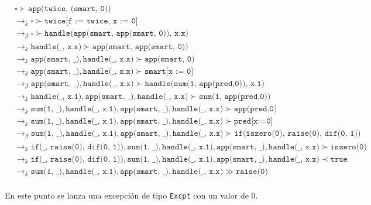 \documentclass{article}
\newcommand{\tx}[1]{\texttt{#1}}
\newcommand{\ra}{\rightarrow}
\begin{document}
\begin{enumerate}
{\begin{itemize}
{			\begin{align*}
				&\square \succ \tx{app(twice, (smart, 0))} \\
				&\ra_k \square \succ \tx{twice[f := twice, x := 0]}\\
				&\ra_{\beta} \square \succ \tx{handle(app(smart, app(smart, 0)), x.x)}\\
				&\ra_k \tx{handle(\_, x.x)} \succ \tx{app(smart, app(smart, 0))} \\
				& \ra_k \tx{app(smart, \_)}, \tx{handle(\_, x.x)} \succ \tx{app(smart, 0)}\\
				&\ra_k \tx{app(smart, \_)}, \tx{handle(\_, x.x)} \succ \tx{smart[x := 0]} \\
				&\ra_{\beta} \tx{app(smart, \_)}, \tx{handle(\_, x.x)} \succ \tx{handle(sum(1, app(pred,0)), x.1)} \\
				&\ra_k \tx{handle(\_, x.1)}, \tx{app(smart, \_)}, \tx{handle(\_, x.x)} \succ \tx{sum(1, app(pred,0))} \\
				&\ra_k \tx{sum(1, \_)}, \tx{handle(\_, x.1)}, \tx{app(smart, \_)}, \tx{handle(\_, x.x)} \succ \tx{app(pred,0)} \\
				&\ra_k \tx{sum(1, \_)}, \tx{handle(\_, x.1)}, \tx{app(smart, \_)}, \tx{handle(\_, x.x)} \succ \tx{pred[x:=0]} \\
				&\ra_{\beta} \tx{sum(1, \_)}, \tx{handle(\_, x.1)}, \tx{app(smart, \_)}, \tx{handle(\_, x.x)} \succ \tx{if(iszero(0), raise(0), dif(0, 1))}\\
				&\ra_k \tx{if(\_, raise(0), dif(0, 1))}, \tx{sum(1, \_)}, \tx{handle(\_, x.1)}, \tx{app(smart, \_)}, \tx{handle(\_, x.x)} \succ \tx{iszero(0)} \\
				&\ra_k \tx{if(\_, raise(0), dif(0, 1))}, \tx{sum(1, \_)}, \tx{handle(\_, x.1)}, \tx{app(smart, \_)}, \tx{handle(\_, x.x)} \prec \tx{true} \\
				&\ra_k \tx{sum(1, \_)}, \tx{handle(\_, x.1)}, \tx{app(smart, \_)}, \tx{handle(\_, x.x)} \gg \tx{raise(0)} \\
			\end{align*}

			En este punto se lanza una excepción de tipo \tx{Excpt} con un valor
			de 0.

}
\end{itemize}}
\end{enumerate}
\end{document}
